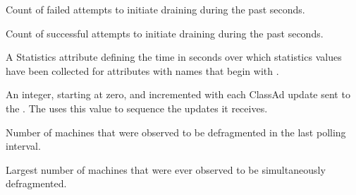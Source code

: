 \begin{description}
\item[\AdAttr{RecentDrainFailures}:] Count of failed attempts
  to initiate draining during the past  seconds.

\item[\AdAttr{RecentDrainSuccesses}:] Count of successful attempts
  to initiate draining during the past  seconds.

\item[\AdAttr{RecentStatsLifetime}:] A Statistics attribute defining 
  the time in seconds over which statistics values have been collected 
  for attributes with names that begin with . 

\item[\AdAttr{UpdateSequenceNumber}:] An integer, starting at zero,
  and incremented with each ClassAd update sent to the .
  The  uses this value to sequence the updates it
  receives.

\item[\AdAttr{WholeMachines}:] Number of machines that were observed
  to be defragmented in the last polling interval.

\item[\AdAttr{WholeMachinesPeak}:] Largest number of machines that were
  ever observed to be simultaneously defragmented.

\end{description}

